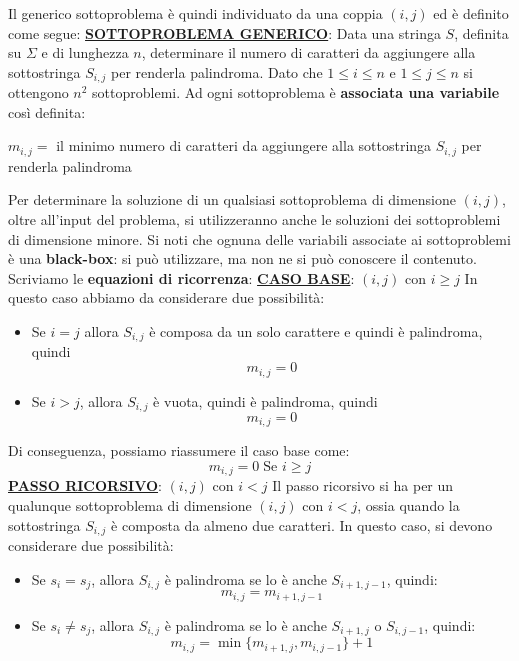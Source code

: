 \documentclass[12pt]{article}
\begin{document}
Il generico sottoproblema è quindi individuato da una coppia $(i,j)$ ed è definito come segue: \newline
\textbf{\underline{SOTTOPROBLEMA GENERICO}}: Data una stringa $S$, definita su $\Sigma$ e di lunghezza $n$, determinare il numero di caratteri da aggiungere alla sottostringa $S_{i,j}$ per renderla palindroma. \newline
Dato che $1 \leq i \leq n$ e $1 \leq j \leq n$ si ottengono $n^2$ sottoproblemi. Ad ogni sottoproblema è \textbf{associata una variabile} così definita:
\begin{center}
    $m_{i,j}=$ il minimo numero di caratteri da aggiungere alla sottostringa $S_{i,j}$ per renderla palindroma
\end{center}
Per determinare la soluzione di un qualsiasi sottoproblema di dimensione $(i,j)$, oltre all'input del problema, si utilizzeranno anche le soluzioni dei sottoproblemi di dimensione minore.
Si noti che ognuna delle variabili associate ai sottoproblemi è una \textbf{black-box}: si può utilizzare, ma non ne si può conoscere il contenuto. Scriviamo le \textbf{equazioni di ricorrenza}: \newline
\textbf{\underline{CASO BASE}}: $(i, j)$ con $i \geq j$ \newline
In questo caso abbiamo da considerare due possibilità:
\begin{itemize}
    \item Se $i = j$ allora $S_{i,j}$ è composa da un solo carattere e quindi è palindroma, quindi $$m_{i,j} = 0$$
    \item Se $i > j$, allora $S_{i,j}$ è vuota, quindi è palindroma, quindi $$m_{i,j} = 0$$
\end{itemize}
Di conseguenza, possiamo riassumere il caso base come:
$$m_{i,j} = 0 \; \textrm{Se } i \geq j$$
\textbf{\underline{PASSO RICORSIVO}}: $(i,j)$ con $i < j$ \newline
Il passo ricorsivo si ha per un qualunque sottoproblema di dimensione $(i,j)$ con $i < j$, ossia quando la sottostringa $S_{i,j}$ è composta da almeno due caratteri. In questo caso, si devono considerare due possibilità:
\begin{itemize}
    \item Se $s_i = s_j$, allora $S_{i,j}$ è palindroma se lo è anche $S_{i+1, j-1}$, quindi:
    $$m_{i,j} = m_{i+1, j-1}$$
    \item Se $s_i \neq s_j$, allora $S_{i,j}$ è palindroma se lo è anche $S_{i+1, j}$ o  $S_{i, j-1}$, quindi:
    $$m_{i,j} = \min\{m_{i+1, j}, m_{i, j-1}\} + 1$$
\end{itemize}
\end{document}
